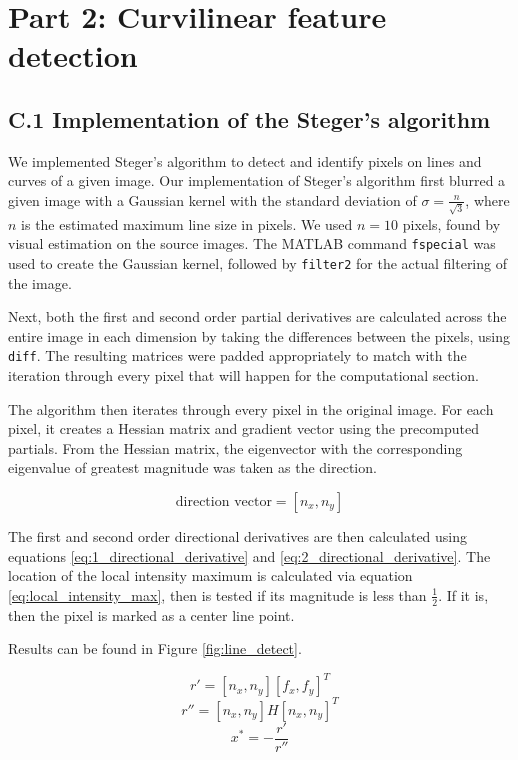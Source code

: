 \documentclass{article}
\begin{document}
\pagebreak
\section*{Part 2: Curvilinear feature detection}

\subsection*{C.1 Implementation of the Steger's algorithm}

We implemented Steger's algorithm to detect and identify pixels on lines and curves of a given image. Our implementation of Steger's algorithm first blurred a given image with a Gaussian kernel with the standard deviation of $\sigma = \frac{n}{\sqrt{3}}$, where $n$ is the estimated maximum line size in pixels. We used $n = 10$ pixels, found by visual estimation on the source images. The MATLAB command \texttt{fspecial} was used to create the Gaussian kernel, followed by \texttt{filter2} for the actual filtering of the image.

Next, both the first and second order partial derivatives are calculated across the entire image in each dimension by taking the differences between the pixels, using \texttt{diff}. The resulting matrices were padded appropriately to match with the iteration through every pixel that will happen for the computational section.

The algorithm then iterates through every pixel in the original image. For each pixel, it creates a Hessian matrix and gradient vector using the precomputed partials. From the Hessian matrix, the eigenvector with the corresponding eigenvalue of greatest magnitude was taken as the direction.

\begin{equation}
\text{direction vector} = [n_x, n_y]
\label{eq:direction}
\end{equation}

The first and second order directional derivatives are then calculated using equations \ref{eq:1_directional_derivative} and \ref{eq:2_directional_derivative}. The location of the local intensity maximum is calculated via equation \ref{eq:local_intensity_max}, then is tested if its magnitude is less than $\frac{1}{2}$. If it is, then the pixel is marked as a center line point.

Results can be found in Figure \ref{fig:line_detect}.

\begin{equation}
r' = [n_x,n_y][f_x,f_y]^T
\label{eq:1_directional_derivative}
\end{equation}
\begin{equation}
r'' = [n_x,n_y]H[n_x,n_y]^T
\label{eq:2_directional_derivative}
\end{equation}
\begin{equation}
x^* = -\frac{r'}{r''}
\label{eq:local_intensity_max}
\end{equation}
\end{document}
